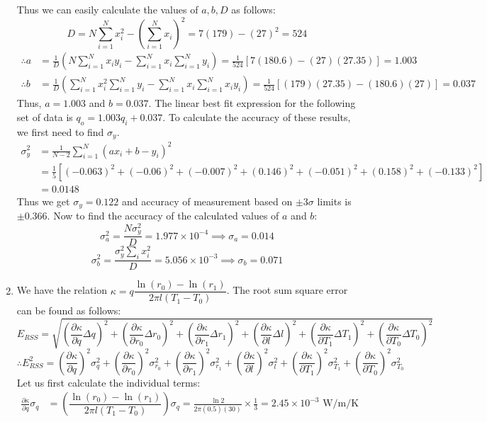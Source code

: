 \documentclass[a4paper, 11pt]{article}
\begin{document}
\begin{enumerate}[label=(\arabic*),leftmargin=*]
Thus we can easily calculate the values of $a,b,D$ as follows:
$$D=N\sum_{i=1}^N x_i^2-\left(\sum_{i=1}^N x_i\right)^2=7(179)-(27)^2=524$$
\begin{align*}
	\therefore a&=\frac{1}{D}\left(N\sum_{i=1}^N x_iy_i-\sum_{i=1}^N x_i\sum_{i=1}^N y_i\right)=\frac{1}{524}[7(180.6)-(27)(27.35)]=1.003\\
	\therefore b&=\frac{1}{D}\left(\sum_{i=1}^N x_i^2\sum_{i=1}^N y_i-\sum_{i=1}^N x_i\sum_{i=1}^N x_iy_i\right)=\frac{1}{524}[(179)(27.35)-(180.6)(27)]=0.037
\end{align*}
Thus, $\boxed{a=1.003}$ and $\boxed{b=0.037}$. The linear best fit expression for the following set of data is $q_o=1.003q_i+0.037$. To calculate the accuracy of these results, we first need to find $\sigma_y$.
\begin{align*}
	\sigma_y^2&=\frac{1}{N-2}\sum_{i=1}^N (ax_i+b-y_i)^2\\
	&=\frac{1}{5}[(-0.063)^2+(-0.06)^2+(-0.007)^2+(0.146)^2+(-0.051)^2+(0.158)^2+(-0.133)^2]\\
	&=0.0148
\end{align*}
Thus we get $\boxed{\sigma_y=0.122}$ and accuracy of measurement based on $\pm 3\sigma$ limits is $\pm 0.366$. Now to find the accuracy of the calculated values of $a$ and $b$:
$$\sigma_a^2=\frac{N\sigma_y^2}{D}=1.977\times 10^{-4}\implies\boxed{\sigma_a=0.014}$$
$$\sigma_b^2=\frac{\sigma_y^2\sum_i x_i^2}{D}=5.056\times 10^{-3}\implies\boxed{\sigma_b=0.071}$$
\newpage
	\item We have the relation $\kappa=q \dfrac{\ln(r_0)-\ln(r_1)}{2\pi l(T_1-T_0)}$. The root sum square error can be found as follows:
	$$E_{RSS}=\sqrt{\left(\frac{\partial\kappa}{\partial q}\Delta q\right)^2+\left(\frac{\partial\kappa}{\partial r_0}\Delta r_0\right)^2+\left(\frac{\partial\kappa}{\partial r_1}\Delta r_1\right)^2+\left(\frac{\partial\kappa}{\partial l}\Delta l\right)^2+\left(\frac{\partial\kappa}{\partial T_1}\Delta T_1\right)^2+\left(\frac{\partial\kappa}{\partial T_0}\Delta T_0\right)^2}$$
	$$\therefore E_{RSS}^2=\left(\frac{\partial\kappa}{\partial q}\right)^2\sigma_q^2+\left(\frac{\partial\kappa}{\partial r_0}\right)^2\sigma_{r_0}^2+\left(\frac{\partial\kappa}{\partial r_1}\right)^2\sigma_{r_1}^2+\left(\frac{\partial\kappa}{\partial l}\right)^2\sigma_{l}^2+\left(\frac{\partial\kappa}{\partial T_1}\right)^2\sigma_{T_1}^2+\left(\frac{\partial\kappa}{\partial T_0}\right)^2\sigma_{T_0}^2$$
Let us first calculate the individual terms:
\begin{align*}
	\frac{\partial\kappa}{\partial q}\sigma_{q}&=\left(\dfrac{\ln(r_0)-\ln(r_1)}{2\pi l(T_1-T_0)}\right)\sigma_{q}=\frac{\ln 2}{2\pi(0.5)(30)}\times \frac{1}{3}=2.45\times 10^{-3} \text{ W/m/K}\\

\end{align*}
\end{enumerate}
\end{document}
